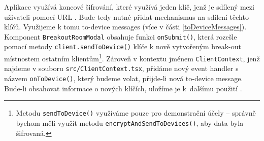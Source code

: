 Aplikace využívá koncové šifrování, které využívá jeden klíč, jenž je sdílený
mezi uživateli pomocí URL \cite{GitHub-ElementCall-CompleteSPAE2EEWork}. Bude
tedy nutné přidat mechanismus na sdílení těchto klíčů. Využijeme k tomu
to-device messages (více v části \ref{toDeviceMessages}). Komponent
\texttt{BreakoutRoomModal} obsahuje funkci
\texttt{onSubmit()}, která rozešle pomocí metody
\texttt{client.sendToDevice()} klíče k nově vytvořeným break-out
místnostem ostatním klientům\footnote{Metodu
    \texttt{sendToDevice()} využíváme pouze pro demonstrační účely
    -- správně bychom měli využít metodu
    \texttt{encryptAndSendToDevices()}, aby data byla šifrovaná.}.
Zároveň v kontextu jménem \texttt{ClientContext}, jenž najdeme v
souboru \texttt{src/ClientContext.tsx}, přidáme nový event handler s
názvem \texttt{onToDevice()}, který budeme volat, přijde-li nová
to-device message. Bude-li obsahovat informace o nových klíčích, uložíme je
k~dalšímu použití \cite{GitHub-ElementCall-BreakoutRooms}.
